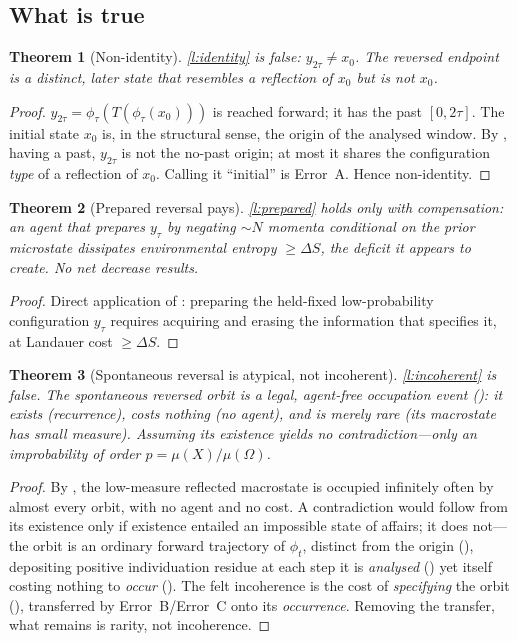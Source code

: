 \documentclass[11pt,a4paper]{article}
\theoremstyle{thmstyle}
\newtheorem{theorem}{Theorem}[section]
\theoremstyle{definition}
\theoremstyle{remark}
\newcommand{\Space}{\Omega}
\begin{document}
\subsection{What is true}

\begin{theorem}[Non-identity]
\label{thm:non-identity}
\ref{l:identity} is false: $y_{2\tau}\neq x_0$. The reversed endpoint is a
distinct, later state that resembles a reflection of $x_0$ but is not $x_0$.
\end{theorem}

\begin{proof}
$y_{2\tau}=\phi_\tau(T(\phi_\tau(x_0)))$ is reached forward; it has the past
$[0,2\tau]$. The initial state $x_0$ is, in the structural sense, the origin of
the analysed window. By , having a past, $y_{2\tau}$ is not
the no-past origin; at most it shares the configuration \emph{type} of a
reflection of $x_0$. Calling it ``initial'' is Error~A. Hence non-identity.
\end{proof}

\begin{theorem}[Prepared reversal pays]
\label{thm:prepared-pays}
\ref{l:prepared} holds only with compensation: an agent that prepares $y_\tau$
by negating $\sim\!N$ momenta conditional on the prior microstate dissipates
environmental entropy $\ge\Delta S$, the deficit it appears to create. No net
decrease results.
\end{theorem}

\begin{proof}
Direct application of : preparing the held-fixed
low-probability configuration $y_\tau$ requires acquiring and erasing the
information that specifies it, at Landauer cost $\ge\Delta S$.
\end{proof}

\begin{theorem}[Spontaneous reversal is atypical, not incoherent]
\label{thm:atypical}
\ref{l:incoherent} is false. The spontaneous reversed orbit is a legal,
agent-free occupation event (): it exists (recurrence), costs
nothing (no agent), and is merely rare (its macrostate has small measure).
Assuming its existence yields no contradiction---only an improbability of order
$p=\mu(X)/\mu(\Space)$.
\end{theorem}

\begin{proof}
By , the low-measure reflected macrostate is occupied infinitely
often by almost every orbit, with no agent and no cost. A contradiction would
follow from its existence only if existence entailed an impossible state of
affairs; it does not---the orbit is an ordinary forward trajectory of
$\phi_t$, distinct from the origin (), depositing positive
individuation residue at each step it is \emph{analysed} () yet
itself costing nothing to \emph{occur} (). The felt
incoherence is the cost of \emph{specifying} the orbit
(), transferred by Error~B/Error~C onto its
\emph{occurrence}. Removing the transfer, what remains is rarity, not
incoherence.
\end{proof}
\end{document}
